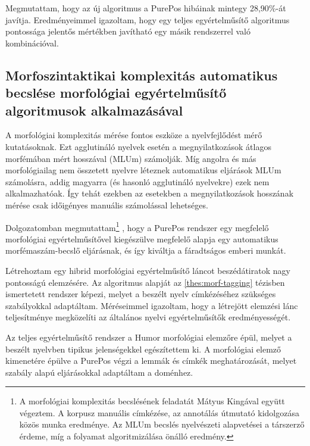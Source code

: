 Megmutattam, hogy az új algoritmus a PurePos hibáinak mintegy 28,90\%-át javítja. 
Eredményeimmel igazoltam, hogy egy teljes egyértelműsítő algoritmus pontossága jelentős mértékben javítható egy másik rendszerrel való kombinációval. 

\subsection{Morfoszintaktikai komplexitás automatikus becslése morfológiai egyértelműsítő algoritmusok alkalmazásával}

A morfológiai komplexitás mérése fontos eszköze a nyelvfejlődést mérő kutatásoknak.
Ezt agglutináló nyelvek esetén a megnyilatkozások átlagos morfémában mért hosszával (MLUm) számolják.
Míg angolra és más morfológiailag nem összetett nyelvre léteznek automatikus eljárások MLUm számolásra, 
addig magyarra (és hasonló agglutináló nyelvekre) ezek nem alkalmazhatóak. 
Így tehát ezekben az esetekben a megnyilatkozások hosszának mérése csak időigényes manuális számolással lehetséges.

Dolgozatomban megmutattam\footnote{A morfológiai komplexitás becslésének feladatát Mátyus Kingával együtt végeztem. A korpusz manuális címkézése, az annotálás útmutató kidolgozása közös munka eredménye. Az MLUm becslés nyelvészeti alapvetései a társzerző érdeme, míg a folyamat algoritmizálása önálló eredmény.}
, hogy a PurePos rendszer egy megfelelő morfológiai egyértelműsítővel kiegészülve megfelelő alapja egy automatikus morfémaszám-becslő eljárásnak, és így kiváltja a fáradtságos emberi munkát. 

\begin{core}
\begin{thesis}
Létrehoztam egy  hibrid morfológiai egyértelműsítő láncot beszédátiratok nagy pontosságú elemzésére. 
Az algoritmus alapját az \ref{thes:morf-tagging} tézisben ismertetett rendszer képezi, melyet a beszélt nyelv címkézéséhez szükséges szabályokkal adaptáltam. 
Méréseimmel igazoltam, hogy a létrejött elemzési lánc teljesítménye megközelíti az általános nyelvi egyértelműsítők eredményességét.
\end{thesis}

\begin{pub}
\cite{Matyus2014,Orosz2014c}
\end{pub}
\end{core}

Az teljes egyértelműsítő rendszer a Humor morfológiai elemzőre épül, melyet a beszélt nyelvben tipikus jelenségekkel egészítettem ki. 
A morfológiai elemző kimenetére épülve a PurePos végzi a lemmák és címkék meghatározását, melyet szabály alapú eljárásokkal adaptáltam a doménhez.

